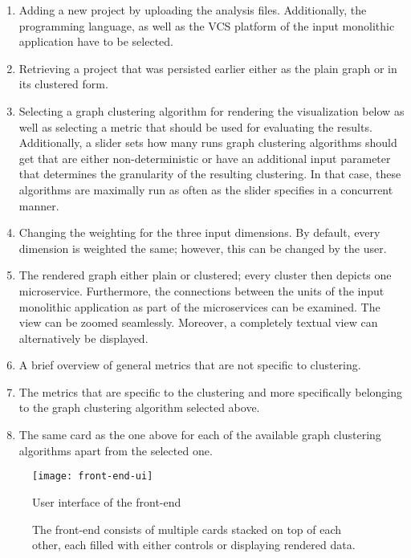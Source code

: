 \documentclass[12pt,a4paper]{report}
\begin{document}
\begin{enumerate}
  \item Adding a new project by uploading the analysis files. Additionally,
        the programming language, as well as the VCS platform of the input
        monolithic application have to be selected.
  \item Retrieving a project that was persisted earlier either as the plain
        graph or in its clustered form.
  \item Selecting a graph clustering algorithm for rendering the visualization
        below as well as selecting a metric that should be used for evaluating
        the results. Additionally, a slider sets how many runs graph clustering
        algorithms should get that are either non-deterministic or have an
        additional input parameter that determines the granularity of the
        resulting clustering. In that case, these algorithms are maximally run
        as often as the slider specifies in a concurrent manner.
  \item Changing the weighting for the three input dimensions. By default,
        every dimension is weighted the same; however, this can be changed by
        the user.
  \item The rendered graph either plain or clustered; every cluster then depicts
        one microservice. Furthermore, the connections between the units of the
        input monolithic application as part of the microservices can be
        examined. The view can be zoomed seamlessly.
        Moreover, a completely textual view can alternatively be displayed.
  \item A brief overview of general metrics that are not specific to clustering.
  \item The metrics that are specific to the clustering and more specifically
        belonging to the graph clustering algorithm selected above.
  \item The same card as the one above for each of the available
        graph clustering algorithms apart from the selected one.
\end{enumerate}

\begin{figure}[htbp]
\centering
\texttt{[image: front-end-ui]}
\caption{User interface of the front-end}
\caption*{\centering
  The front-end consists of multiple cards stacked on top of each other,
  each filled with either controls or displaying rendered data.
}
\label{fig:front-end-ui}
\end{figure}
\end{document}
